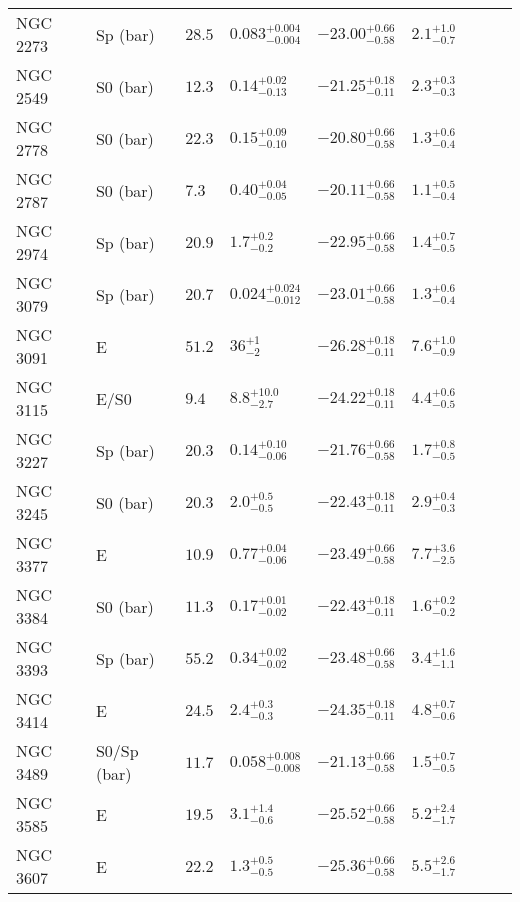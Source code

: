 \begin{table*}
\begin{center}
\begin{tabular}{llllllrll}
NGC 2273  &  Sp (bar)  &  $28.5$  &  $0.083_{-0.004}^{+0.004}$   &  $-23.00_{-0.58}^{+0.66}$   &  $2.1_{-0.7}^{+1.0}$   &   \\ 
NGC 2549  &  S0 (bar)  &  $12.3$  &  $0.14_{-0.13}^{+0.02}$   &  $-21.25_{-0.11}^{+0.18}$   &  $2.3_{-0.3}^{+0.3}$   &   \\ 
NGC 2778  &  S0 (bar)  &  $22.3$  &  $0.15_{-0.10}^{+0.09}$   &  $-20.80_{-0.58}^{+0.66}$   &  $1.3_{-0.4}^{+0.6}$   &   \\ 
NGC 2787  &  S0 (bar)  &  $7.3$  &  $0.40_{-0.05}^{+0.04}$   &  $-20.11_{-0.58}^{+0.66}$   &  $1.1_{-0.4}^{+0.5}$   &   \\ 
NGC 2974  &  Sp (bar)  &  $20.9$  &  $1.7_{-0.2}^{+0.2}$   &  $-22.95_{-0.58}^{+0.66}$   &  $1.4_{-0.5}^{+0.7}$   &   \\ 
NGC 3079  &  Sp (bar)  &  $20.7$  &  $0.024_{-0.012}^{+0.024}$   &  $-23.01_{-0.58}^{+0.66}$   &  $1.3_{-0.4}^{+0.6}$   &   \\ 
NGC 3091  &  E  &  $51.2$  &  $36_{-2}^{+1}$   &  $-26.28_{-0.11}^{+0.18}$   &  $7.6_{-0.9}^{+1.0}$   &   \\ 
NGC 3115  &  E/S0  &  $9.4$  &  $8.8_{-2.7}^{+10.0}$   &  $-24.22_{-0.11}^{+0.18}$   &  $4.4_{-0.5}^{+0.6}$   &   \\ 
NGC 3227  &  Sp (bar)  &  $20.3$  &  $0.14_{-0.06}^{+0.10}$   &  $-21.76_{-0.58}^{+0.66}$   &  $1.7_{-0.5}^{+0.8}$   &   \\ 
NGC 3245  &  S0 (bar)  &  $20.3$  &  $2.0_{-0.5}^{+0.5}$   &  $-22.43_{-0.11}^{+0.18}$   &  $2.9_{-0.3}^{+0.4}$   &   \\ 
NGC 3377  &  E  &  $10.9$  &  $0.77_{-0.06}^{+0.04}$   &  $-23.49_{-0.58}^{+0.66}$   &  $7.7_{-2.5}^{+3.6}$   &   \\ 
NGC 3384  &  S0 (bar)  &  $11.3$  &  $0.17_{-0.02}^{+0.01}$   &  $-22.43_{-0.11}^{+0.18}$   &  $1.6_{-0.2}^{+0.2}$   &   \\ 
NGC 3393  &  Sp (bar)  &  $55.2$  &  $0.34_{-0.02}^{+0.02}$   &  $-23.48_{-0.58}^{+0.66}$   &  $3.4_{-1.1}^{+1.6}$   &   \\ 
NGC 3414  &  E  &  $24.5$  &  $2.4_{-0.3}^{+0.3}$   &  $-24.35_{-0.11}^{+0.18}$   &  $4.8_{-0.6}^{+0.7}$   &   \\ 
NGC 3489  &  S0/Sp (bar)  &  $11.7$  &  $0.058_{-0.008}^{+0.008}$   &  $-21.13_{-0.58}^{+0.66}$   &  $1.5_{-0.5}^{+0.7}$   &   \\ 
NGC 3585  &  E  &  $19.5$  &  $3.1_{-0.6}^{+1.4}$   &  $-25.52_{-0.58}^{+0.66}$   &  $5.2_{-1.7}^{+2.4}$   &   \\ 
NGC 3607  &  E  &  $22.2$  &  $1.3_{-0.5}^{+0.5}$   &  $-25.36_{-0.58}^{+0.66}$   &  $5.5_{-1.7}^{+2.6}$   &   \\ 

\end{tabular}
\end{center}
\end{table*}
